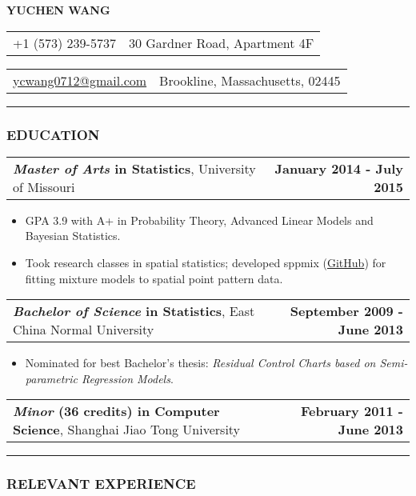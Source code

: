 \documentclass[11pt]{article}
\makeatletter
\newcommand{\headerrow}[2]
{\begin{tabular*}{\linewidth}{l@{\extracolsep{\fill}}r}
	#1 & #2 \\
\end{tabular*}
}
\makeatother
\begin{document}
\begin{center}
	\huge\textbf{YUCHEN WANG}
\end{center}
\noindent\headerrow{+1 (573) 239-5737}{30 Gardner Road, Apartment 4F}
\headerrow{\href{mailto:ycwang0712@gmail.com}{ycwang0712@gmail.com}}{Brookline, Massachusetts, 02445}

\vspace{-.8em}
\hrule

\subsubsection*{\centering EDUCATION}
\vspace{-.3em}

\headerrow
	{\textbf{\emph{Master of Arts} in Statistics}, University of Missouri}
	{\textbf{January 2014 - July 2015}}
	\begin{itemize}
		\item GPA 3.9 with A+ in Probability Theory, Advanced Linear Models and Bayesian Statistics.
		\item Took research classes in spatial statistics; developed sppmix (\href{https://github.com/wangyuchen/sppmix}{GitHub}) for fitting mixture models to spatial point pattern data.
	\end{itemize}
\noindent\headerrow
	{\textbf{\emph{Bachelor of Science} in Statistics}, East China Normal University}
	{\textbf{September 2009 - June 2013}}
	\begin{itemize}
		\item Nominated for best Bachelor's thesis: \textit{Residual Control Charts based on Semi-parametric Regression Models}.
	\end{itemize}
\noindent\headerrow
	{\textbf{\emph{Minor} (36 credits) in Computer Science}, Shanghai Jiao Tong University}
	{\textbf{February 2011 - June 2013}}


\vspace{-.8em}
\hrule


\subsubsection*{\centering RELEVANT EXPERIENCE}
\vspace{-.3em}
\end{document}
